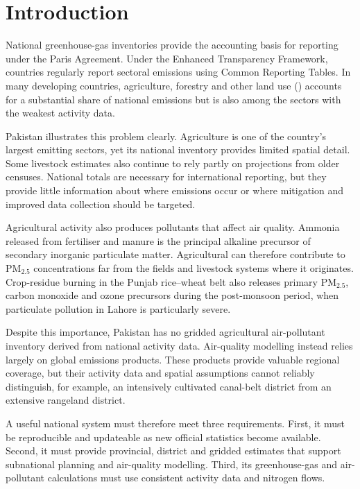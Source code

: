 \section{Introduction}
\label{sec:introduction}

National greenhouse-gas inventories provide the accounting basis for reporting under the
Paris Agreement. Under the Enhanced Transparency Framework, countries regularly report
sectoral emissions using Common Reporting Tables. In many developing countries,
agriculture, forestry and other land use (\AFOLU{}) accounts for a substantial share of
national emissions but is also among the sectors with the weakest activity data.

Pakistan illustrates this problem clearly. Agriculture is one of the country's largest
emitting sectors, yet its national inventory provides limited spatial detail. Some
livestock estimates also continue to rely partly on projections from older censuses.
National totals are necessary for international reporting, but they provide little
information about where emissions occur or where mitigation and improved data collection
should be targeted.

Agricultural activity also produces pollutants that affect air quality. Ammonia released
from fertiliser and manure is the principal alkaline precursor of secondary inorganic
particulate matter. Agricultural \NHthree{} can therefore contribute to PM$_{2.5}$
concentrations far from the fields and livestock systems where it originates.
Crop-residue burning in the Punjab rice--wheat belt also releases primary PM$_{2.5}$,
carbon monoxide and ozone precursors during the post-monsoon period, when particulate
pollution in Lahore is particularly severe.

Despite this importance, Pakistan has no gridded agricultural air-pollutant inventory
derived from national activity data. Air-quality modelling instead relies largely on global
emissions products. These products provide valuable regional coverage, but their activity
data and spatial assumptions cannot reliably distinguish, for example, an intensively
cultivated canal-belt district from an extensive rangeland district.

A useful national system must therefore meet three requirements. First, it must be
reproducible and updateable as new official statistics become available. Second, it must
provide provincial, district and gridded estimates that support subnational planning and
air-quality modelling. Third, its greenhouse-gas and air-pollutant calculations must use
consistent activity data and nitrogen flows.

